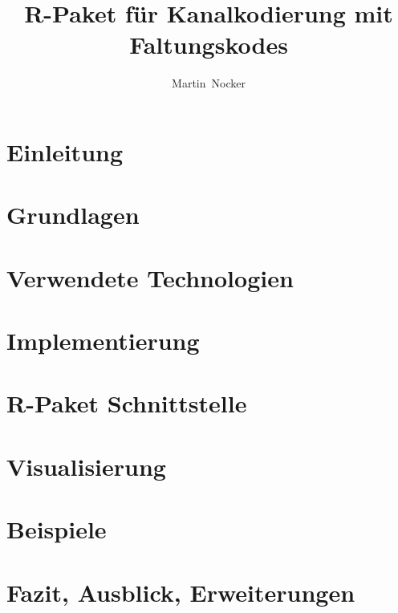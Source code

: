 \documentclass[germanthesis]{thesis-style}
\author{Martin~Nocker}
\title{R-Paket für Kanalkodierung mit Faltungskodes}
\begin{document}
\maketitle

\begin{abstract}

\end{abstract}

\tableofcontents
\clearpage
{}

\chapter{Einleitung}
\label{kapitel:einleitung}


\chapter{Grundlagen}
\label{kapitel:grundlagen}


\chapter{Verwendete Technologien}
\label{kapitel:technologien}


\chapter{Implementierung}
\label{kapitel:implementierung}


\chapter{R-Paket Schnittstelle}
\label{kapitel:interface}


\chapter{Visualisierung}
\label{kapitel:visualisierung}


\chapter{Beispiele}
\label{kapitel:beispiele}

\chapter{Fazit, Ausblick, Erweiterungen}
\label{kapitel:fazit}

\cleardoublepage%

\listofabbreviations
\clearpage

\listoffigures
\clearpage

\clearpage


\lstlistoflistings
\clearpage

\printbibliography
\end{document}
